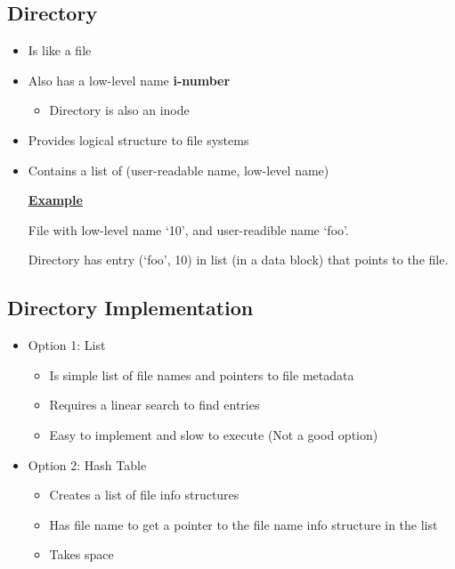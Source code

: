\documentclass[12pt]{article}
\begin{document}
\subsection{Directory}
\begin{itemize}
    \item Is like a file
    \item Also has a low-level name \textbf{i-number}
    \begin{itemize}
        \item Directory is also an inode
    \end{itemize}
    \item Provides logical structure to file systems
    \item Contains a list of (user-readable name, low-level name)

    \bigskip

    \underline{\textbf{Example}}

    \bigskip

    File with low-level name `10', and user-readible name `foo'.

    \bigskip

    Directory has entry (`foo', 10) in list (in a data block) that points to the file.
\end{itemize}

\subsection{Directory Implementation}
\begin{itemize}
    \item Option 1: List
    \begin{itemize}
        \item Is simple list of file names and pointers to file metadata
        \item Requires a linear search to find entries
        \item Easy to implement and slow to execute (Not a good option)
    \end{itemize}
    \item Option 2: Hash Table
    \begin{itemize}
        \item Creates a list of file info structures
        \item Has file name to get a pointer to the file name info structure in the list
        \item Takes space
    \end{itemize}
\end{itemize}
\end{document}
